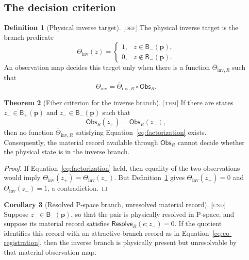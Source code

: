 \documentclass[11pt]{article}
\newcommand{\Obs}{\ensuremath{\mathsf{Obs}}}
\newcommand{\Branch}{\ensuremath{\mathsf B}}
\newcommand{\Resolve}{\ensuremath{\mathsf{Resolve}}}
\newcommand{\Defn}{\textsc{[def]}}
\newcommand{\Thm}{\textsc{[thm]}}
\newcommand{\Cnd}{\textsc{[cnd]}}
\theoremstyle{definition}
\newtheorem{definition}{Definition}[section]
\newtheorem{theorem}[definition]{Theorem}
\newtheorem{corollary}[definition]{Corollary}
\begin{document}
\subsection{The decision criterion}

\begin{definition}[Physical inverse target]
\label{def:target}
\Defn{} The physical inverse target is the branch predicate
\begin{equation}
\Theta_{\mathrm{inv}}(z)=
\begin{cases}
1,& z\in\Branch_-(\mathbf p),\\
0,& z\notin\Branch_-(\mathbf p).
\end{cases}
\label{eq:inverse-target}
\end{equation}
An observation map decides this target only when there is a function
$\overline\Theta_{\mathrm{inv},R}$ such that
\begin{equation}
\Theta_{\mathrm{inv}}
=
\overline\Theta_{\mathrm{inv},R}\circ\Obs_R.
\label{eq:factorization}
\end{equation}
\end{definition}

\begin{theorem}[Fiber criterion for the inverse branch]
\label{thm:fiber}
\Thm{} If there are states $z_+\in\Branch_+(\mathbf p)$ and
$z_-\in\Branch_-(\mathbf p)$ such that
\begin{equation}
\Obs_R(z_+)=\Obs_R(z_-),
\label{eq:co-registration}
\end{equation}
then no function $\overline\Theta_{\mathrm{inv},R}$ satisfying
Equation~\eqref{eq:factorization} exists.  Consequently, the material record
available through $\Obs_R$ cannot decide whether the physical state is in the
inverse branch.
\end{theorem}

\begin{proof}
If Equation~\eqref{eq:factorization} held, then equality of the two observations
would imply
$\Theta_{\mathrm{inv}}(z_+)=\Theta_{\mathrm{inv}}(z_-)$.
But Definition~\ref{def:target} gives
$\Theta_{\mathrm{inv}}(z_+)=0$ and
$\Theta_{\mathrm{inv}}(z_-)=1$, a contradiction.
\end{proof}

\begin{corollary}[Resolved P-space branch, unresolved material record]
\label{cor:blindspot}
\Cnd{} Suppose $z_-\in\Branch_-(\mathbf p)$, so that the pair is physically
resolved in P-space, and suppose its material record satisfies
$\Resolve_R(e;z_-)=0$.  If the quotient identifies this record with an
attractive-branch record as in Equation~\eqref{eq:co-registration}, then the
inverse branch is physically present but unresolvable by that material
observation map.
\end{corollary}
\end{document}
